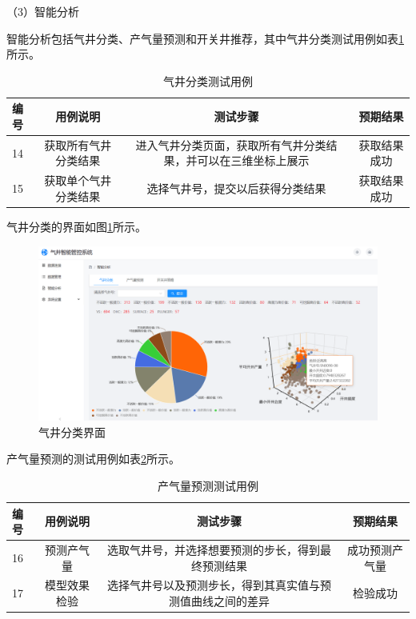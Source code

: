 （3）智能分析

智能分析包括气井分类、产气量预测和开关井推荐，其中气井分类测试用例如表\ref{tab:clusterte}所示。

\begin{table}
    \renewcommand{\arraystretch}{1.5}
    \centering
    \caption{气井分类测试用例}
    \label{tab:clusterte}
    \begin{tabular}{|l|c|c|c|}
        \hline
        编号 & 用例说明 & 测试步骤 & 预期结果 \\
        \hline
        14 & 获取所有气井分类结果 & 进入气井分类页面，获取所有气井分类结果，并可以在三维坐标上展示 & 获取结果成功 \\
        \hline
        15 & 获取单个气井分类结果 & 选择气井号，提交以后获得分类结果 & 获取结果成功 \\
        \hline
    \end{tabular}
\end{table}

气井分类的界面如图\ref{fig:clusterre}所示。

\begin{figure}
    \centering
    \includegraphics{figure/气井分类.jpg}
    \caption{气井分类界面}
    \label{fig:clusterre}
\end{figure}

产气量预测的测试用例如表\ref{tab:predite}所示。

\begin{table}
    \renewcommand{\arraystretch}{1.5}
    \centering
    \caption{产气量预测测试用例}
    \begin{tabular}{|l|c|c|c|}
        \hline
        编号 & 用例说明 & 测试步骤 & 预期结果 \\
        \hline
        16 & 预测产气量 & 选取气井号，并选择想要预测的步长，得到最终预测结果 & 成功预测产气量 \\
        \hline
        17 & 模型效果检验 & 选择气井号以及预测步长，得到其真实值与预测值曲线之间的差异 & 检验成功 \\
        \hline
    \end{tabular}
    \label{tab:predite}
\end{table}

